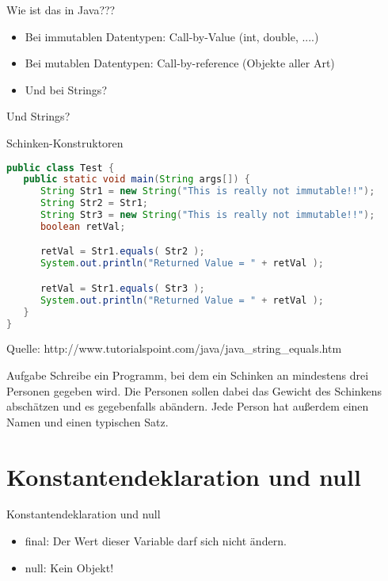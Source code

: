 \documentclass[18pt]{beamer}
\begin{document}
\begin{frame}{Wie ist das in Java???}
\begin{itemize}
 \item Bei immutablen Datentypen: Call-by-Value (int, double, ....)
 \pause
 \item Bei mutablen Datentypen: Call-by-reference (Objekte aller Art)
 \pause
 \item Und bei Strings?
\end{itemize}

\end{frame}


\begin{frame}[fragile]{Und Strings?}
\begin{exampleblock}{Schinken-Konstruktoren}
\begin{lstlisting}[language=java] 
public class Test {
   public static void main(String args[]) {
      String Str1 = new String("This is really not immutable!!");
      String Str2 = Str1;
      String Str3 = new String("This is really not immutable!!");
      boolean retVal;

      retVal = Str1.equals( Str2 );
      System.out.println("Returned Value = " + retVal );

      retVal = Str1.equals( Str3 );
      System.out.println("Returned Value = " + retVal );
   }
}
\end{lstlisting}
\end{exampleblock}
\footnotesize Quelle: http://www.tutorialspoint.com/java/java\_string\_equals.htm
\end{frame}

\begin{frame}{Aufgabe}
 Schreibe ein Programm, bei dem ein Schinken an mindestens drei Personen gegeben wird. 
 Die Personen sollen dabei das Gewicht des Schinkens abschätzen und es gegebenfalls abändern.
 Jede Person hat außerdem einen Namen und einen typischen Satz.
\end{frame}


\section{Konstantendeklaration und null}
\begin{frame}{Konstantendeklaration und null}
\begin{itemize}
 \item final: Der Wert dieser Variable darf sich nicht ändern.
 \item null: Kein Objekt!
\end{itemize}
\pause
\end{frame}
\end{document}
